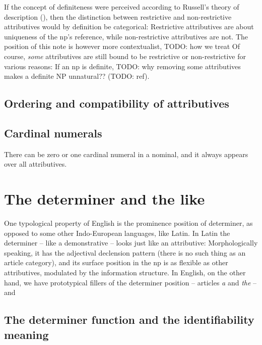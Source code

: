 \documentclass[UTF8, a4paper, oneside, scheme=plain]{ctexrep}
\newcommand{\corpus}[1]{\emph{#1}}
\begin{document}
If the concept of definiteness were perceived according to Russell's theory of description 
(),
then the distinction between restrictive and non-restrictive attributives 
would by definition be categorical:
Restrictive attributives are about uniqueness of the \acs{np}'s reference,
while non-restrictive attributives are not.
The position of this note is however more contextualist,
TODO: how we treat 
Of course, \emph{some} attributives are still bound to be restrictive 
or non-restrictive for various reasons:
If an \acs{np} is definite, 
TODO: why removing some attributives makes a definite NP unnatural??
(TODO: ref).

\subsection{Ordering and compatibility of attributives}

\subsection{Cardinal numerals}

There can be zero or one cardinal numeral in a nominal,
and it always appears over all attributives.

\begin{exe}
    \ex 
\end{exe}

\section{The determiner and the like}\label{sec:np.det}

One typological property of English is 
the prominence position of determiner,
as opposed to some other Indo-European languages, like Latin.
In Latin the determiner -- like a demonstrative -- 
looks just like an attributive:
Morphologically speaking, it has the adjectival declension pattern
(there is no such thing as an article category),
and its surface position in the \acs{np} 
is as flexible as other attributives,
modulated by the information structure.
In English, on the other hand, we have prototypical fillers of the determiner position
-- articles \corpus{a} and \corpus{the} -- 
and 

\subsection{The determiner function and the identifiability meaning}\label{sec:np.det.definite}
\end{document}

